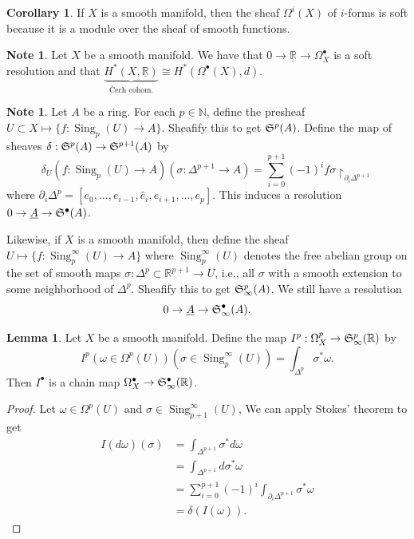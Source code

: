 \documentclass[10pt,letterpaper,cm]{nupset}
\theoremstyle{definition}
\newtheorem{note}[definition]{Note}
\theoremstyle{theorem}
\newtheorem{lemma}[definition]{Lemma}
\newtheorem{corollary}[definition]{Corollary}
\theoremstyle{remark}
\newcommand{\N}{\mathbb N}
\newcommand{\R}{\mathbb{R}}
\newcommand{\1}{\mathbb{1}}
\newcommand{\0}{\vec 0}
\DeclareMathOperator{\sing}{Sing}
\begin{document}
\begin{corollary}
If $X$ is a smooth manifold, then the sheaf $\Omega^i(X)$ of $i$-forms is soft because it is a module over the sheaf of smooth functions. 
\end{corollary}


\begin{note}
Let $X$ be a smooth manifold. We have that $0 \to \underline{\R} \to \Omega^{\bullet}_X$ is a soft resolution and that $\underbrace{H^{\ast}(X, \underline{\R})}_{\text{\v{C}ech cohom.}} \cong H^{\ast}(\Omega^{\bullet}(X), d)$.
\end{note}

\begin{note}
Let $A$ be a ring. For each $p \in \N$, define the presheaf $U\subset X \mapsto \{f : \sing_p(U) \to A\}$. Sheafify this to get $\frak{S}^p(A)$. Define the map of sheaves $\delta: \frak{S}^p(A)\to \frak{S}^{p+1}(A)$ by $$\delta_U(f : \sing_{p}(U) \to A)(\sigma : \Delta^{p+1} \to A) = \sum_{i=0}^{p+1} ({-}1)^i f{\sigma \restriction_{\partial_i{\Delta^{p+1}}}}    $$ where $\partial_i{\Delta^p} = [e_0, \ldots, e_{i-1}, \hat{e}_i, e_{i+1}, \ldots, e_p]$. This induces a resolution $0 \to \underline{A} \to \frak{S}^{\bullet}(A)$.

Likewise, if $X$ is a smooth manifold, then define the sheaf $U \mapsto \{f : \sing_p^{\infty}(U) \to A\}$ where $\sing_p^{\infty}(U)$ denotes the free abelian group on the set of smooth maps $\sigma: \Delta^p\subset \R^{p+1} \to U$, i.e., all $\sigma$ with a smooth extension to some neighborhood of $\Delta^p$. Sheafify this to get $\frak{S}_{\infty}^p(A)$. We still have a resolution $$0 \to \underline{A} \to \frak{S}_{\infty}^{\bullet}(A).$$
\end{note}

\begin{lemma} 
Let $X$ be a smooth manifold. Define the map $I^p: \Omega^{p}_{X} \to \frak{S}^{p}_{\infty}(\R)$ by $$I^p(\omega \in \Omega^p(U))(\sigma \in \sing_p^{\infty}(U)) = \int_{\Delta^p} \sigma^{\ast}{\omega}.$$ 
 Then $I^{\bullet}$ is a chain map  $\Omega^{\bullet}_{X} \to \frak{S}^{\bullet}_{\infty}(\R)$.
\end{lemma}
\begin{proof} 
Let $\omega \in \Omega^p(U)$ and $\sigma \in \sing_{p+1}^{\infty}(U)$, We can apply Stokes' theorem to get
\begin{align*}
I(d{\omega})(\sigma) & = \int_{\Delta^{p+1}}\sigma^{\ast}d{\omega}
\\ & = \int_{\Delta^{p+1}}d{\sigma^{\ast}{\omega}}
\\ & = \sum_{i=0}^{p+1}({-}1)^i \int_{\partial_i{\Delta^{p+1}}}\sigma^{\ast}{\omega}
\\ & = \delta(I(\omega)).
\end{align*}
\end{proof}
\end{document}
